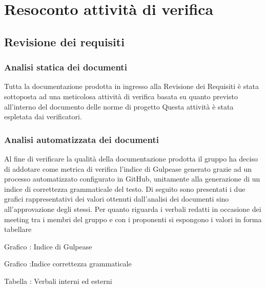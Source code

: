 \section{Resoconto attività di verifica}
\subsection{Revisione dei requisiti}
\subsubsection{Analisi statica dei documenti}
Tutta la documentazione prodotta in ingresso alla Revisione dei Requisiti è stata sottoposta ad una meticolosa attività di verifica
basata su quanto previsto all'interno del documento delle norme di progetto
Questa attività è stata espletata dai verificatori.

\subsubsection{Analisi automatizzata dei documenti}
Al fine di verificare la qualità della documentazione prodotta il gruppo ha deciso di addotare come metrica di verifica
l'indice di Gulpease generato grazie ad un processo automatizzato configurato in GitHub, unitamente alla generazione di un indice di 
correttezza grammaticale del testo.
Di seguito sono presentati i due grafici rappresentativi dei valori ottenuti dall'analisi dei documenti sino all'approvazione degli stessi.
Per quanto riguarda i verbali redatti in occasione dei meeting tra i membri del gruppo e con i proponenti si espongono i valori in forma tabellare


\begin{center}
    Grafico : Indice di Gulpease

    Grafico :Indice correttezza grammaticale


    Tabella : Verbali interni ed esterni
\end{center}



